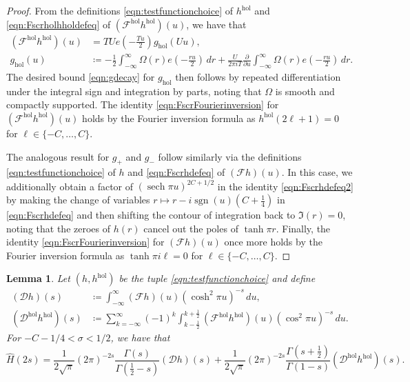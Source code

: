 \documentclass[11pt,a4paper]{amsart}
\newcommand{\dee}{\partial}
\newcommand{\Dscr}{\mathscr{D}}
\newcommand{\Fscr}{\mathscr{F}}
\newcommand{\hol}{\mathrm{hol}}
\DeclareMathOperator{\sech}{sech}
\DeclareMathOperator{\sgn}{sgn}
\numberwithin{equation}{section}
\newtheorem{lemma}[equation]{Lemma}
\theoremstyle{remark}
\theoremstyle{definition}
\begin{document}
\begin{proof}
From the definitions \eqref{eqn:testfunctionchoice} of $h^{\hol}$ and \eqref{eqn:Fscrholhholdefeq} of $(\Fscr^{\hol} h^{\hol})(u)$, we have that
\begin{align*}
(\Fscr^{\hol} h^{\hol})(u) & = TU e\left(-\frac{Tu}{2}\right) g_{\hol}(Uu),	\\
g_{\hol}(u) & \coloneqq -\frac{1}{2} \int_{-\infty}^{\infty} \Omega(r) e\left(-\frac{ru}{2}\right) \, dr + \frac{U}{2\pi i T} \frac{\dee}{\dee u} \int_{-\infty}^{\infty} \Omega(r) e\left(-\frac{ru}{2}\right) \, dr.
\end{align*}
The desired bound \eqref{eqn:gdecay} for $g_{\hol}$ then follows by repeated differentiation under the integral sign and integration by parts, noting that $\Omega$ is smooth and compactly supported. The identity \eqref{eqn:FscrFourierinversion} for $(\Fscr^{\hol} h^{\hol})(u)$ holds by the Fourier inversion formula as $h^{\hol}(2\ell + 1) = 0$ for $\ell \in \{-C,\ldots,C\}$. 

The analogous result for $g_{+}$ and $g_{-}$ follow similarly via the definitions \eqref{eqn:testfunctionchoice} of $h$ and \eqref{eqn:Fscrhdefeq} of $(\Fscr h)(u)$. In this case, we additionally obtain a factor of $(\sech \pi u)^{2C + 1/2}$ in the identity \eqref{eqn:Fscrhdefeq2} by making the change of variables $r \mapsto r - i\sgn(u)(C + \frac{1}{4})$ in \eqref{eqn:Fscrhdefeq} and then shifting the contour of integration back to $\Im(r) = 0$, noting that the zeroes of $h(r)$ cancel out the poles of $\tanh \pi r$. Finally, the identity \eqref{eqn:FscrFourierinversion} for $(\Fscr h)(u)$ once more holds by the Fourier inversion formula as $\tanh \pi i \ell = 0$ for $\ell \in \{-C,\ldots,C\}$.
\end{proof}

\begin{lemma}
Let $(h,h^{\hol})$ be the tuple \eqref{eqn:testfunctionchoice} and define
\begin{align}
\label{eqn:Dscrhdefeq}
(\Dscr h)(s) & \coloneqq \int_{-\infty}^{\infty} (\Fscr h)(u) (\cosh^2 \pi u)^{-s} \, du,	\\
\label{eqn:Dscrholhholdefeq}
(\Dscr^{\hol} h^{\hol})(s) & \coloneqq \sum_{k = -\infty}^{\infty} (-1)^k \int_{k - \frac{1}{2}}^{k + \frac{1}{2}} (\Fscr^{\hol} h^{\hol})(u) (\cos^2 \pi u)^{-s} \, du.
\end{align}
For $-C - 1/4 < \sigma < 1/2$, we have that
\begin{equation}
\label{eqn:HMellinFourier}
\widehat{H}(2s) = \frac{1}{2\sqrt{\pi}} (2\pi)^{-2s} \frac{\Gamma(s)}{\Gamma\left(\frac{1}{2} - s\right)} (\Dscr h)(s) + \frac{1}{2\sqrt{\pi}} (2\pi)^{-2s} \frac{\Gamma\left(s + \frac{1}{2}\right)}{\Gamma(1 - s)} (\Dscr^{\hol} h^{\hol})(s).
\end{equation}
\end{lemma}
\end{document}
